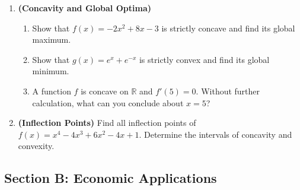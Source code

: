 \documentclass[12pt, a4paper]{article}
\theoremstyle{definition}
\newcommand{\R}{\mathbb{R}}
\begin{document}
\begin{enumerate}[label=\textbf{A\arabic*.}, leftmargin=2.5em]
\item \textbf{(Concavity and Global Optima)}
\begin{enumerate}[label=(\alph*)]
  \item Show that $f(x) = -2x^2 + 8x - 3$ is strictly concave and find
        its global maximum.
  \item Show that $g(x) = e^x + e^{-x}$ is strictly convex and find its
        global minimum.
  \item A function $f$ is concave on $\R$ and $f'(5) = 0$.
        Without further calculation, what can you conclude about $x=5$?
\end{enumerate}

\item \textbf{(Inflection Points)}
Find all inflection points of $f(x) = x^4 - 4x^3 + 6x^2 - 4x + 1$.
Determine the intervals of concavity and convexity.

\end{enumerate}
\newpage
\subsection{Section B: Economic Applications}
\end{document}
